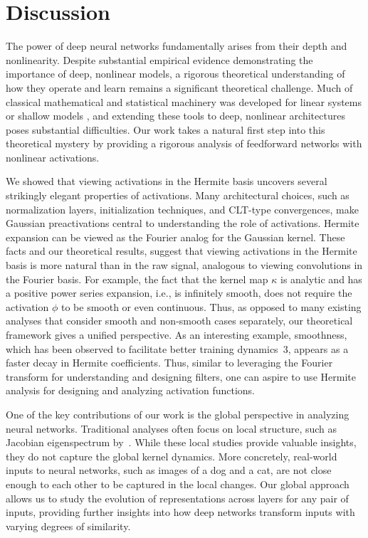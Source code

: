 \documentclass[twoside]{article}
\theoremstyle{definition}
\begin{document}
\section{Discussion}
The power of deep neural networks fundamentally arises from their depth and nonlinearity. Despite substantial empirical evidence demonstrating the importance of deep, nonlinear models, a rigorous theoretical understanding of how they operate and learn remains a significant theoretical challenge. Much of classical mathematical and statistical machinery was developed for linear systems or shallow models \citep{hastie2009elements}, and extending these tools to deep, nonlinear architectures poses substantial difficulties. Our work takes a natural first step into this theoretical mystery by providing a rigorous analysis of feedforward networks with nonlinear activations. 

We showed that viewing activations in the Hermite basis uncovers several strikingly elegant properties of activations. Many architectural choices, such as normalization layers, initialization techniques, and CLT-type convergences, make Gaussian preactivations central to understanding the role of activations. Hermite expansion can be viewed as the Fourier analog for the Gaussian kernel. These facts and our theoretical results, suggest that viewing activations in the Hermite basis is more natural than in the raw signal, analogous to viewing convolutions in the Fourier basis. For example, the fact that the kernel map $\kappa$ is analytic and has a positive power series expansion, i.e., is infinitely smooth, does not require the activation $\phi$ to be smooth or even continuous. Thus, as opposed to many existing analyses that consider smooth and non-smooth cases separately, our theoretical framework gives a unified perspective. As an interesting example, smoothness, which has been observed to facilitate better training dynamics~3\citep{hayou2019impact}, appears as a faster decay in Hermite coefficients. Thus, similar to leveraging the Fourier transform for understanding and designing filters, one can aspire to use Hermite analysis for designing and analyzing activation functions.


One of the key contributions of our work is the global perspective in analyzing neural networks. Traditional analyses often focus on local structure, such as Jacobian eigenspectrum by~\citet{pennington2018emergence}. While these local studies provide valuable insights, they do not capture the global kernel dynamics. More concretely, real-world inputs to neural networks, such as images of a dog and a cat, are not close enough to each other to be captured in the local changes. Our global approach allows us to study the evolution of representations across layers for any pair of inputs, providing further insights into how deep networks transform inputs with varying degrees of similarity.
\end{document}
